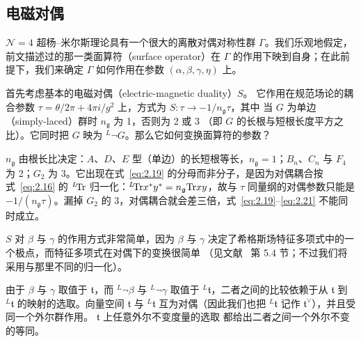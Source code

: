 

\subsection{电磁对偶}

\label{sec:2.4}

${\mathcal N}=4$ 超杨–米尔斯理论具有一个很大的离散对偶对称性群 $\Gamma$。我们乐观地假定，前文描述过的那一类面算符（surface operator）在 $\Gamma$ 的作用下映到自身；在此前提下，我们来确定 $\Gamma$ 如何作用在参数
$(\alpha,\beta,\gamma,\eta)$ 上。


首先考虑基本的电磁对偶（electric-magnetic duality）$S$。
它作用在规范场论的耦合参数 $\tau=\theta/2\pi+4\pi i/g^2$ 上，方式为
$S:\tau\to -1/n_{\mathfrak g}\tau$，其中
当 $G$ 为单边（simply-laced）群时 $n_{\mathfrak g}$ 为 1，否则为 2 或 3
（即 $G$ 的长根与短根长度平方之比）。它同时把 $G$ 映为 $^L\neg G$。那么它如何变换面算符的参数？

\begin{yizhu}[易错点]
$n_{\mathfrak g}$ 由根长比决定：$A$、$D$、$E$ 型（单边）的长短根等长，$n_{\mathfrak g}=1$；$B_n$、$C_n$ 与 $F_4$ 为 2；$G_2$ 为 3。它出现在式~\eqref{eq:2.19} 的分母而非分子，是因为对偶耦合按式~\eqref{eq:2.16} 的 ${}^L\negthinspace{\rm Tr}$ 归一化：${}^L\negthinspace{\rm Tr} x^*y^*=n_{\mathfrak g}{\rm Tr} xy$，故与 $\tau$ 同量纲的对偶参数只能是 $-1/(n_{\mathfrak g}\tau)$。漏掉 $G_2$ 的 3，对偶耦合就会差三倍，式~\eqref{eq:2.19}--\eqref{eq:2.21} 不能同时成立。
\end{yizhu}

\bigskip{}

$S$ 对 $\beta$ 与 $\gamma$ 的作用方式非常简单，因为 $\beta$ 与 $\gamma$ 决定了希格斯场特征多项式中的一个极点，而特征多项式在对偶下的变换很简单
（见文献~\cite{ref8} 第 5.4 节；不过我们将采用与那里不同的归一化）。

%
%
由于 $\beta$ 与 $\gamma$ 取值于 $\mathfrak t$，而 $^L\neg\beta$ 与 $^L\neg\gamma$ 取值于 $^L\mathfrak t$，二者之间的比较依赖于从 $\mathfrak t$
到 $^L\mathfrak t$ 的映射的选取。向量空间 $\mathfrak t$ 与 $^L\mathfrak t$ 互为对偶（因此我们也把 $^L\mathfrak t$
记作 $\mathfrak t^\vee$），并且受同一个外尔群作用。
$\mathfrak t$ 上任意外尔不变度量的选取
都给出二者之间一个外尔不变的等同。


